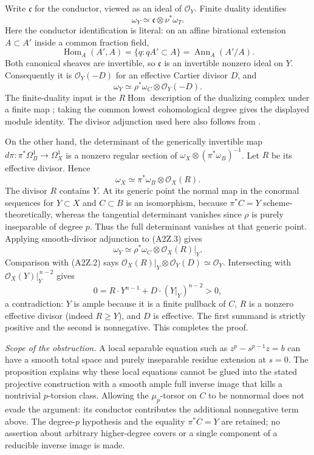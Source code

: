 Write $\mathfrak c$ for the conductor, viewed as an ideal of
$\mathcal O_Y$. Finite duality identifies
\[
 \omega_Y\simeq\mathfrak c\otimes\nu^*\omega_T.
\]
Here the conductor identification is literal: on an affine
birational extension $A\subset A'$ inside a common fraction field,
\[
 \operatorname{Hom}_A(A',A)
   =\{q:qA'\subset A\}
   =\operatorname{Ann}_A(A'/A).
\]
Both canonical sheaves are invertible, so $\mathfrak c$ is an
invertible nonzero ideal on $Y$. Consequently it is
$\mathcal O_Y(-D)$ for an effective Cartier divisor $D$, and
\[
 \omega_Y\simeq\rho^*\omega_C\otimes\mathcal O_Y(-D).
                                                               \tag{A2Z.2}
\]
The finite-duality input is the $R\operatorname{Hom}$ description
of the dualizing complex under a finite map
\cite[Lemma 47.15.8, with the finite-module description in Section 49.5]{DGJ_StacksFiniteDuality};
taking the common lowest cohomological degree gives the displayed
module identity. The divisor adjunction used here also follows
from \cite[Lemma 48.14.1, Tag 0B4B]{DGJ_StacksAdjunction}.

On the other hand, the determinant of the generically invertible
map $d\pi:\pi^*\Omega_B^1\to\Omega_X^1$ is a nonzero regular
section of $\omega_X\otimes(\pi^*\omega_B)^{-1}$. Let $R$ be
its effective divisor. Hence
\[
 \omega_X\simeq\pi^*\omega_B\otimes\mathcal O_X(R).
                                                               \tag{A2Z.3}
\]
The divisor $R$ contains $Y$. At its generic point the normal
map in the conormal sequences for $Y\subset X$ and $C\subset B$
is an isomorphism, because $\pi^*C=Y$ scheme-theoretically,
whereas the tangential determinant vanishes since $\rho$ is
purely inseparable of degree $p$. Thus the full determinant
vanishes at that generic point.
Applying smooth-divisor adjunction to (A2Z.3) gives
\[
 \omega_Y\simeq\rho^*\omega_C\otimes
                  \mathcal O_X(R)|_Y.                         \tag{A2Z.4}
\]
Comparison with (A2Z.2) says
$\mathcal O_X(R)|_Y\otimes\mathcal O_Y(D)\simeq\mathcal O_Y$.
Intersecting with $\mathcal O_X(Y)|_Y^{\,n-2}$ gives
\[
 0=R\cdot Y^{n-1}+D\cdot (Y|_Y)^{n-2}>0,
\]
a contradiction: $Y$ is ample because it is a finite pullback
of $C$, $R$ is a nonzero effective divisor (indeed $R\geq Y$),
and $D$ is effective. The first summand is strictly positive and
the second is nonnegative. This completes the proof.

\emph{Scope of the obstruction.}
A local separable equation such as
$z^p-s^{p-1}z=b$ can have a smooth total space and purely
inseparable residue extension at $s=0$. The proposition explains
why these local equations cannot be glued into the stated
projective construction with a smooth ample full inverse image
that kills a nontrivial $p$-torsion class. Allowing the
$\mu_p$-torsor on $C$ to be nonnormal does not evade the argument:
its conductor contributes the additional nonnegative term above.
The degree-$p$ hypothesis and the equality $\pi^*C=Y$ are retained;
no assertion about arbitrary higher-degree covers or a single
component of a reducible inverse image is made.
